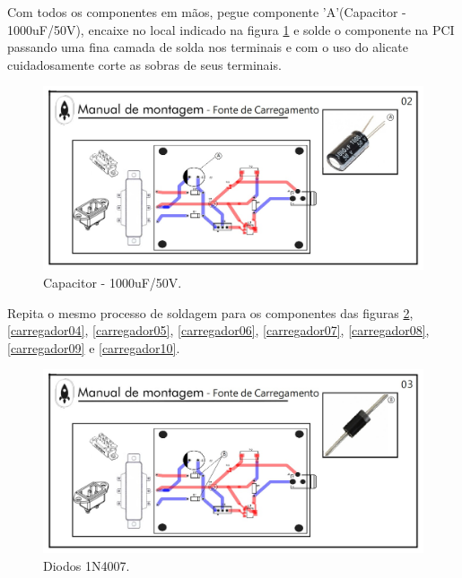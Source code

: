 Com todos os componentes em mãos, pegue componente 'A’(Capacitor - 1000uF/50V), encaixe no local indicado na figura \ref{carregador02} e solde o componente na PCI passando uma fina camada de solda nos terminais e com o uso do alicate cuidadosamente corte as sobras de seus terminais.

\begin{figure}[H]
  \centering
  \includegraphics[width=\textwidth]{Figuras/Carregador/carregador_manual_02.jpg}
  \caption{Capacitor - 1000uF/50V.} 
  \label{carregador02}
\end{figure}

Repita o mesmo processo de soldagem para os componentes das figuras \ref{carregador03},  \ref{carregador04}, \ref{carregador05}, \ref{carregador06}, \ref{carregador07}, \ref{carregador08}, \ref{carregador09} e \ref{carregador10}.

\begin{figure}[H]
  \centering
  \includegraphics[width=\textwidth]{Figuras/Carregador/carregador_manual_03.jpg}
  \caption{Diodos 1N4007.} 
  \label{carregador03}
\end{figure}

